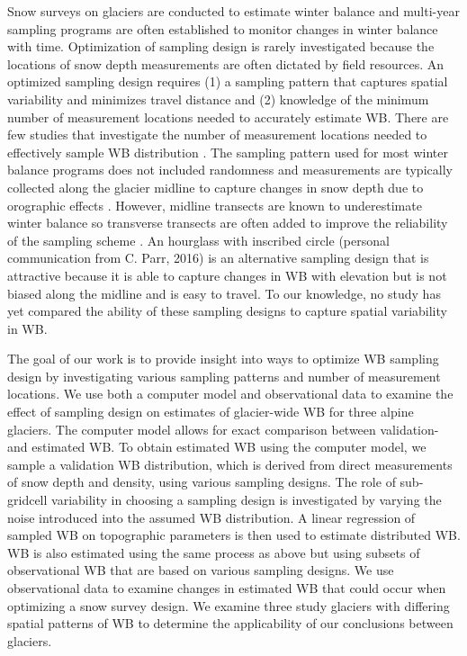 \documentclass[twocolumn,letterpaper]{igs}
\begin{document}
Snow surveys on glaciers are conducted to estimate winter balance and multi-year sampling programs are often established to monitor changes in winter balance with time. Optimization of sampling design is rarely investigated because the locations of snow depth measurements are often dictated by field resources. An optimized sampling design requires (1) a sampling pattern that captures spatial variability and minimizes travel distance and (2) knowledge of the minimum number of measurement locations needed to accurately estimate WB. There are few studies that investigate the number of measurement locations needed to effectively sample WB distribution \citep[c.f.][]{Fountain1999,Walmsley2015}. The sampling pattern used for most winter balance programs does not included randomness and measurements are typically collected along the glacier midline \citep[e.g.][]{Kaser2003} to capture changes in snow depth due to orographic effects \citep[e.g.][]{Grunewald2014}. However, midline transects are known to underestimate winter balance so transverse transects are often added to improve the reliability of the sampling scheme \citep[e.g.][]{Walmsley2015}. An hourglass with inscribed circle (personal communication from C. Parr, 2016) is an alternative sampling design that is attractive because it is able to capture changes in WB with elevation but is not biased along the midline and is easy to travel. To our knowledge, no study has yet compared the ability of these sampling designs to capture spatial variability in WB.  

The goal of our work is to provide insight into ways to optimize WB sampling design by investigating various sampling patterns and number of measurement locations. We use both a computer model and observational data to examine the effect of sampling design on estimates of glacier-wide WB for three alpine glaciers. The computer model allows for exact comparison between validation- and estimated WB. To obtain estimated WB using the computer model, we sample a validation WB distribution, which is derived from direct measurements of snow depth and density, using various sampling designs. The role of sub-gridcell variability in choosing a sampling design is investigated by varying the noise introduced into the assumed WB distribution. A linear regression of sampled WB on topographic parameters is then used to estimate distributed WB. WB is also estimated using the same process as above but using subsets of observational WB that are based on various sampling designs. We use observational data to examine changes in estimated WB that could occur when optimizing a snow survey design. We examine three study glaciers with differing spatial patterns of WB to determine the applicability of our conclusions between glaciers. 
\end{document}
